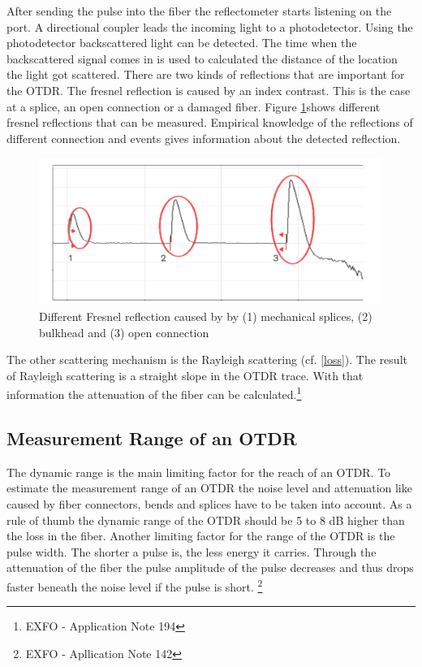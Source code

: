 After sending the pulse into the fiber the reflectometer starts listening on the port. A directional coupler leads the incoming light to a photodetector. Using the photodetector backscattered light can be detected. The time when the backscattered signal comes in is used to calculated the distance of the location the light got scattered.
There are two kinds of reflections that are important for the OTDR.
The fresnel reflection is caused by an index contrast. This is the case at a splice, an open connection or a damaged fiber. Figure \ref{fig:fresnel}\footnotemark[2] shows different fresnel reflections that can be measured. Empirical knowledge of the reflections of different connection and events gives information about the detected reflection.
 

\begin{figure}%
\centering
\includegraphics[width=.7\columnwidth]{grafiken/fresnel.png}%
\caption{Different Fresnel reflection caused by by (1) mechanical splices, (2) bulkhead and (3) open connection}%
\label{fig:fresnel}%
\end{figure}


The other scattering mechanism is the Rayleigh scattering (cf. \ref{loss}). The result of Rayleigh scattering is a straight slope in the OTDR trace. With that information the attenuation of the fiber can be calculated.\footnote[2]{EXFO - Application Note 194}

\subsection{Measurement Range of an OTDR}
The dynamic range is the main limiting factor for the reach of an OTDR. To estimate the measurement range of an OTDR the noise level and attenuation like caused by fiber connectors, bends and splices have to be taken into account. As a rule of thumb the dynamic range of the OTDR should be 5 to 8 dB higher than the loss in the fiber.
Another limiting factor for the range of the OTDR is the pulse width. The shorter a pulse is, the less energy it carries. Through the attenuation of the fiber the pulse amplitude of the pulse decreases and thus drops faster beneath the noise level if the pulse is short.
\footnote[3]{EXFO - Apllication Note 142}

